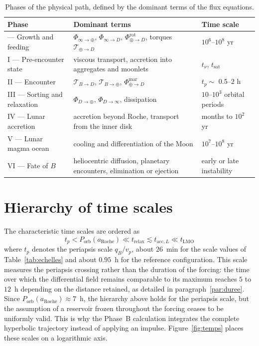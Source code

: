 \documentclass[11pt,a4paper,openany]{report}
\newcommand{\aR}{a_{\mathrm{Roche}}}
\begin{document}
\begin{table}[htbp]
\centering
\small
\caption{Phases of the physical path, defined by the dominant terms of the flux equations.}
\label{tab:phases}
\begin{tabularx}{\textwidth}{>{\raggedright\arraybackslash}p{3.1cm}
>{\raggedright\arraybackslash}X >{\raggedright\arraybackslash}p{3.6cm}}
\toprule
\textbf{Phase} & \textbf{Dominant terms} & \textbf{Time scale} \\
\midrule
0 --- Growth and feeding & $\Phi_{\infty\to\oplus}$, $\Phi_{\infty\to D}$, $\Phi^{\mathrm{rot}}_{\oplus\to D}$, torques $\mathcal{T}_{\oplus\to D}$ & $10^{6}$--$10^{8}$ yr \\
I --- Pre-encounter state & viscous transport, accretion into aggregates and moonlets & $t_\nu$, $t_{\mathrm{sat}}$ \\
II --- Encounter & $\mathcal{T}_{B\to D}$, $\mathcal{T}_{B\to\oplus}$, $\Phi^{\mathrm{mar}}_{\oplus\to D}$ & $t_{p}\sim$ 0.5--2 h \\
III --- Sorting and relaxation & $\Phi_{D\to\oplus}$, $\Phi_{D\to\infty}$, dissipation & $10$--$10^{3}$ orbital periods \\
IV --- Lunar accretion & accretion beyond Roche, transport from the inner disk & months to $10^{2}$ yr \\
V --- Lunar magma ocean & cooling and differentiation of the Moon & $10^{7}$--$10^{8}$ yr \\
VI --- Fate of $B$ & heliocentric diffusion, planetary encounters, elimination or ejection & early or late instability \\
\bottomrule
\end{tabularx}
\end{table}

\section{Hierarchy of time scales}

The characteristic time scales are ordered as
\begin{equation}
\boxed{\;t_{p}<P_{\mathrm{orb}}(\aR)\ll t_{\mathrm{relax}}\lesssim t_{\mathrm{acc},L}
\ll t_{\mathrm{LMO}}\;}
\label{eq:hierarchie-temps}
\end{equation}
where $t_{p}$ denotes the periapsis scale $q_B/v_p$, about $26$~min for the scale values
of Table~\ref{tab:echelles} and about $0.95$~h for the reference configuration. This scale measures
the periapsis crossing rather than the duration of the forcing: the time over which the
differential field remains comparable to its maximum reaches $5$ to $12$~h depending on the
distance retained, as detailed in paragraph~\ref{par:duree}. Since
$P_{\mathrm{orb}}(\aR)\approx7$~h, the hierarchy above holds for the periapsis scale, but the
assumption of a reservoir frozen throughout the forcing ceases to be uniformly valid. This is why
the Phase~B calculation integrates the complete hyperbolic trajectory instead of applying an
impulse. Figure~\ref{fig:temps} places these scales on a logarithmic axis.
\end{document}
